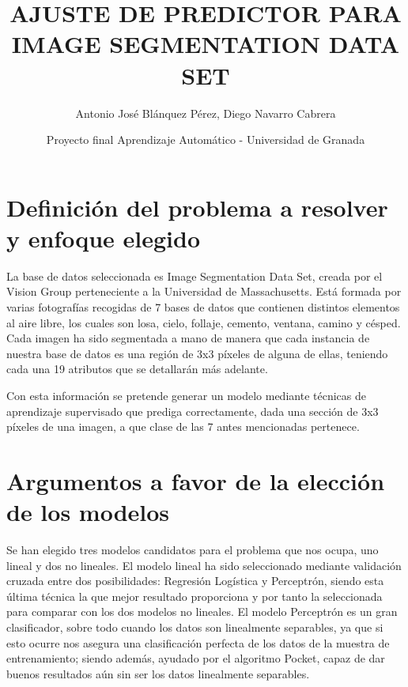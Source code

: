 \documentclass{article}
\title{AJUSTE DE PREDICTOR PARA IMAGE SEGMENTATION DATA SET}
\author{Antonio José Blánquez Pérez, Diego Navarro Cabrera}
\date{Proyecto final Aprendizaje Automático - Universidad de Granada}
\begin{document}
 \setlength{\parskip}{1em} 

	\maketitle
	

	\section{Definición del problema a resolver y enfoque elegido} %
	La base de datos seleccionada es Image Segmentation Data Set, creada por el Vision Group perteneciente a la Universidad de Massachusetts. Está formada por varias fotografías recogidas de 7 bases de datos que contienen distintos elementos al aire libre, los cuales son losa, cielo, follaje, cemento, ventana, camino y césped. Cada imagen ha sido segmentada a mano de manera que cada instancia de nuestra base de datos es una región de 3x3 píxeles de alguna de ellas, teniendo cada una 19 atributos que se detallarán más adelante. 
	\par
	Con esta información se pretende generar un modelo mediante técnicas de aprendizaje supervisado que prediga correctamente, dada una sección de 3x3 píxeles de una imagen, a que clase de las 7 antes mencionadas pertenece.
	
	\section{Argumentos a favor de la elección de los modelos} %
	
	Se han elegido tres modelos candidatos para el problema que nos ocupa, uno lineal y dos no lineales. El modelo lineal ha sido seleccionado mediante validación cruzada entre dos posibilidades: Regresión Logística y Perceptrón, siendo esta última técnica la que mejor resultado proporciona y por tanto la seleccionada para comparar con los dos modelos no lineales. El modelo Perceptrón es un gran clasificador, sobre todo cuando los datos son linealmente separables, ya que si esto ocurre nos asegura una clasificación perfecta de los datos de la muestra de entrenamiento; siendo además, ayudado por el algoritmo Pocket, capaz de dar buenos resultados aún sin ser los datos linealmente separables.
	
\end{document}
